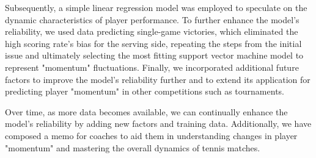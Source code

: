 \documentclass[12pt]{article}
\begin{document}
Subsequently, a simple linear regression model was employed to speculate on the dynamic characteristics of player performance. To further enhance the model's reliability, we used data predicting single-game victories, which eliminated the high scoring rate's bias for the serving side, repeating the steps from the initial issue and ultimately selecting the most fitting support vector machine model to represent "momentum" fluctuations. Finally, we incorporated additional future factors to improve the model's reliability further and to extend its application for predicting player "momentum" in other competitions such as tournaments.

Over time, as more data becomes available, we can continually enhance the model's reliability by adding new factors and training data. Additionally, we have composed a memo for coaches to aid them in understanding changes in player "momentum" and mastering the overall dynamics of tennis matches.
\end{document}
